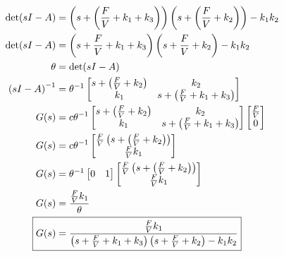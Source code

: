 \documentclass[12pt]{article}
\begin{document}
\begin{enumerate}
\begin{align*}
    \mathrm{det}(s I - A) &= \left(s + \left(\frac{F}{V} + k_1 + k_3\right)\right) \left(s + \left(\frac{F}{V} + k_2\right)\right) - k_1 k_2 \\
    \mathrm{det}(s I - A) &= \left(s + \frac{F}{V} + k_1 + k_3\right) \left(s + \frac{F}{V} + k_2\right) - k_1 k_2 \\
    \theta &= \mathrm{det}(s I - A) \\
    \left(s I - A\right)^{-1} &= \theta^{-1} \begin{bmatrix}
        s + \left(\frac{F}{V} + k_2\right) & k_2 \\
        k_1 & s + \left(\frac{F}{V} + k_1 + k_3\right) \\
    \end{bmatrix} \\
    G(s) &= c \theta^{-1} \begin{bmatrix}
        s + \left(\frac{F}{V} + k_2\right) & k_2 \\
        k_1 & s + \left(\frac{F}{V} + k_1 + k_3\right) \\
    \end{bmatrix} \begin{bmatrix}
        \frac{F}{V} \\
        0 \\
    \end{bmatrix} \\
    G(s) &= c \theta^{-1} \begin{bmatrix}
        \frac{F}{V} \left(s + \left(\frac{F}{V} + k_2\right)\right) \\
        \frac{F}{V} k_1 \\
    \end{bmatrix} \\
    G(s) &= \theta^{-1} \begin{bmatrix}
        0 & 1 \\
    \end{bmatrix} \begin{bmatrix}
        \frac{F}{V} \left(s + \left(\frac{F}{V} + k_2\right)\right) \\
        \frac{F}{V} k_1 \\
    \end{bmatrix} \\
    G(s) &= \frac{\frac{F}{V} k_1}{\theta} \\
    \Aboxed{G(s) &= \frac{\frac{F}{V} k_1}{\left(s + \frac{F}{V} + k_1 + k_3\right) \left(s + \frac{F}{V} + k_2\right) - k_1 k_2}}
\end{align*}



\end{enumerate}
\end{document}
